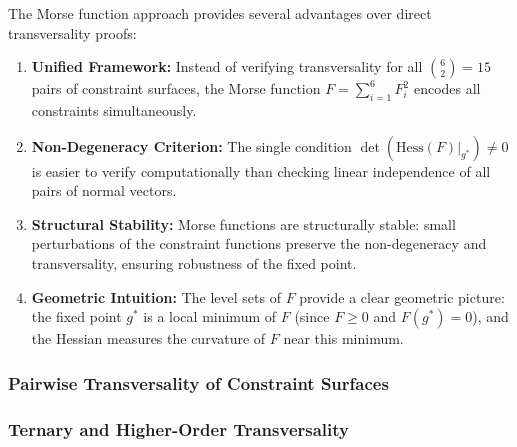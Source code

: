 {\begin{remark}
The Morse function approach provides several advantages over direct transversality proofs:

\begin{enumerate}

\item \textbf{Unified Framework:} Instead of verifying transversality for all $\binom{6}{2} = 15$ pairs of constraint surfaces, the Morse function $F = \sum_{i=1}^6 F_i^2$ encodes all constraints simultaneously.

\item \textbf{Non-Degeneracy Criterion:} The single condition $\det(\text{Hess}(F)|_{g^*}) \neq 0$ is easier to verify computationally than checking linear independence of all pairs of normal vectors.

\item \textbf{Structural Stability:} Morse functions are structurally stable: small perturbations of the constraint functions preserve the non-degeneracy and transversality, ensuring robustness of the fixed point.

\item \textbf{Geometric Intuition:} The level sets of $F$ provide a clear geometric picture: the fixed point $g^*$ is a local minimum of $F$ (since $F \geq 0$ and $F(g^*) = 0$), and the Hessian measures the curvature of $F$ near this minimum.

\end{enumerate}

\end{remark}

\subsubsection{Pairwise Transversality of Constraint Surfaces}











\subsubsection{Ternary and Higher-Order Transversality}

}
